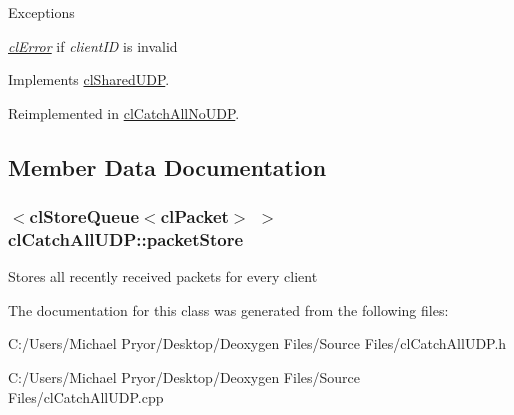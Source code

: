 \begin{DoxyExceptions}{Exceptions}
\item[{\em \hyperlink{structcl_error}{clError}}]if {\itshape clientID\/} is invalid \end{DoxyExceptions}


Implements \hyperlink{classcl_shared_u_d_p_a6985d2cd42ad37bc2477efb162bad157}{clSharedUDP}.



Reimplemented in \hyperlink{classcl_catch_all_no_u_d_p_af80b84880abeb4cc701c4facd4391156}{clCatchAllNoUDP}.



\subsection{Member Data Documentation}
\hypertarget{classcl_catch_all_u_d_p_a8c46150bb5f8219841e47561b6c96f30}{
\subsubsection[{packetStore}]{$<${\bf clStoreQueue}$<${\bf clPacket}$>$ $>$ {\bf clCatchAllUDP::packetStore}}}
\label{classcl_catch_all_u_d_p_a8c46150bb5f8219841e47561b6c96f30}
Stores all recently received packets for every client 

The documentation for this class was generated from the following files:\begin{DoxyCompactItemize}
\item 
C:/Users/Michael Pryor/Desktop/Deoxygen Files/Source Files/clCatchAllUDP.h\item 
C:/Users/Michael Pryor/Desktop/Deoxygen Files/Source Files/clCatchAllUDP.cpp\end{DoxyCompactItemize}
